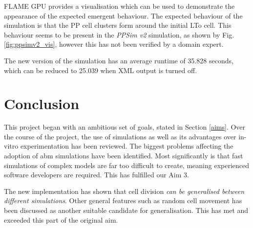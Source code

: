 \documentclass{UoYCSproject}
\begin{document}
\gls{FLAME GPU} provides a visualisation which can be used to demonstrate the appearance of the expected emergent behaviour.
The expected behaviour of the simulation is that the \gls{PP} cell clusters form around the initial \gls{LTo} cell.
This behaviour seems to be present in the \textit{PPSim v2} simulation, as shown by Fig. \ref{fig:ppsimv2_vis}, however this has not been verified by a domain expert.

The new version of the simulation has an average runtime of 35.828 seconds, which can be reduced to 25.039 when XML output is turned off.

\chapter{Conclusion}
This project began with an ambitious set of goals, stated in Section \ref{aims}.
Over the course of the project, the use of simulations as well as its advantages over \gls{in-vitro} experimentation has been reviewed.
The biggest problems affecting the adoption of \gls{abm} simulations have been identified.
Most significantly is that fast simulations of complex models are far too difficult to create, meaning experienced software developers are required.
This has fulfilled our Aim 3.

The new implementation has shown that cell division \textit{can be generalised between different simulations}.
Other general features such as random cell movement has been discussed as another suitable candidate for generalisation.
This has met and exceeded this part of the original aim.
\end{document}
